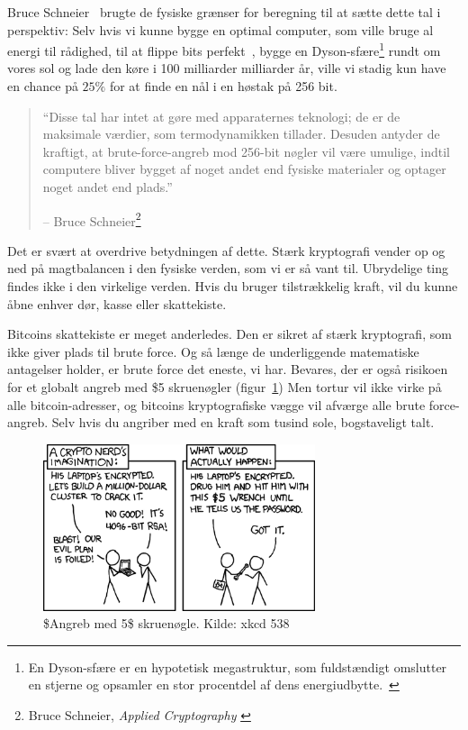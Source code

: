 \documentclass[paper=6in:9in,pagesize=pdftex,headinclude=on,footinclude=on,12pt]{scrbook}
\begin{document}
Bruce Schneier~\cite{web:schneier} brugte de fysiske grænser for beregning til at sætte dette tal i perspektiv: Selv hvis vi kunne bygge en optimal computer, som ville bruge al energi til rådighed, til at flippe bits perfekt~\cite{wiki:landauer}, bygge en Dyson-sfære\footnote{En Dyson-sfære er en hypotetisk megastruktur, som fuldstændigt omslutter en stjerne og opsamler en stor procentdel af dens energiudbytte.~\cite{wiki:dyson}} rundt om vores sol og lade den køre i 100 milliarder milliarder år, ville vi stadig kun have en chance på $25\%$ for at finde en nål i en høstak på 256 bit.\begin{quotation}\begin{samepage} \enquote{Disse tal har intet at gøre med apparaternes teknologi; de er de maksimale værdier, som termodynamikken tillader. Desuden antyder de kraftigt, at brute-force-angreb mod 256-bit nøgler vil være umulige, indtil computere bliver bygget af noget andet end fysiske materialer og optager noget andet end plads.} \begin{flushright} -- Bruce Schneier\footnote{Bruce Schneier, \textit{Applied Cryptography} \cite{bruce-schneier}}
\end{flushright}\end{samepage}\end{quotation}

Det er svært at overdrive betydningen af dette. Stærk kryptografi vender op og ned på magtbalancen i den fysiske verden, som vi er så vant til. Ubrydelige ting findes ikke i den virkelige verden. Hvis du bruger tilstrækkelig kraft, vil du kunne åbne enhver dør, kasse eller skattekiste.

Bitcoins skattekiste er meget anderledes. Den er sikret af stærk kryptografi, som ikke giver plads til brute force. Og så længe de underliggende matematiske antagelser holder, er brute force det eneste, vi har. Bevares, der er også risikoen for et globalt angreb med \$5 skruenøgler (figur~\ref{fig:xkcd-538}) Men tortur vil ikke virke på alle bitcoin-adresser, og bitcoins kryptografiske vægge vil afværge alle brute force-angreb. Selv hvis du angriber med en kraft som tusind sole, bogstaveligt talt.\begin{figure}
  \centering
  \includegraphics[width=8cm]{assets/images/xkcd-538.png}
  \caption{\$Angreb med 5\$ skruenøgle. Kilde: xkcd 538}
  \label{fig:xkcd-538}
\end{figure}
\end{document}
